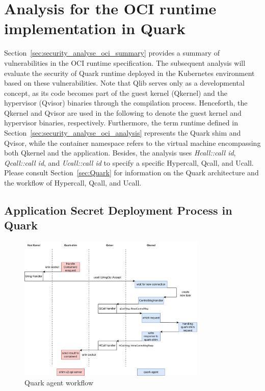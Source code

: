 \section{Analysis for the OCI runtime implementation in Quark}
\label{sec:security_analyse_quark_analysis}
Section~\ref{sec:security_analyse_oci_summary} provides a summary of vulnerabilities in the OCI runtime specification. The subsequent analysis will evaluate the security of Quark runtime deployed in the Kubernetes environment based on these vulnerabilities. Note that Qlib serves only as a developmental concept, as its code becomes part of the guest kernel (Qkernel) 
and the hypervisor (Qvisor) binaries through the compilation process. Henceforth, the Qkernel and Qvisor are used in the following to denote the guest kernel and hypervisor binaries, respectively. Furthermore, the term runtime defined in Section~\ref{sec:security_analyse_oci_analysis} represents the Quark shim and Qvisor, while the container namespace 
refers to the virtual machine encompassing both Qkernel and the application. Besides, the analysis uses \emph{Hcall::call id}, \emph{Qcall::call id}, and \emph{Ucall::call id} to specify a specific Hypercall, Qcall, and Ucall. Please consult Section~\ref{sec:Quark} for information on the Quark architecture and the workflow of Hypercall, Qcall, and Ucall.


\subsection{Application Secret Deployment Process in Quark}
\label{sec:security_analyse_secret_deployment}
\begin{figure}[htp]
    \centering
    \includegraphics[width=0.8\textwidth]{images/quark-agent-work-flow.png}
    \caption[Quark Agent Workflow]{Quark agent workflow}
    \label{fig:quark_agent_work_flow}
\end{figure}


